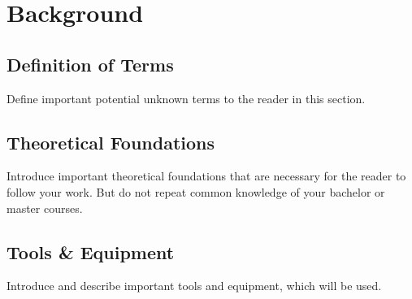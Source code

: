 
\chapter{Background}
\label{chapter:background}

\lipsum

\section{Definition of Terms}
\label{sec:definition-of-terms}

Define important potential unknown terms to the reader in this section.
\lipsum[100]

\section{Theoretical Foundations}
\label{sec:theoretical-foundations}

Introduce important theoretical foundations that are necessary for the reader to follow your work. But do not repeat common knowledge of your bachelor or master courses.
\lipsum[150-200]

\section{Tools \& Equipment}
\label{sec:tools-equipment}

Introduce and describe important tools and equipment, which will be used.
\lipsum[150-200]